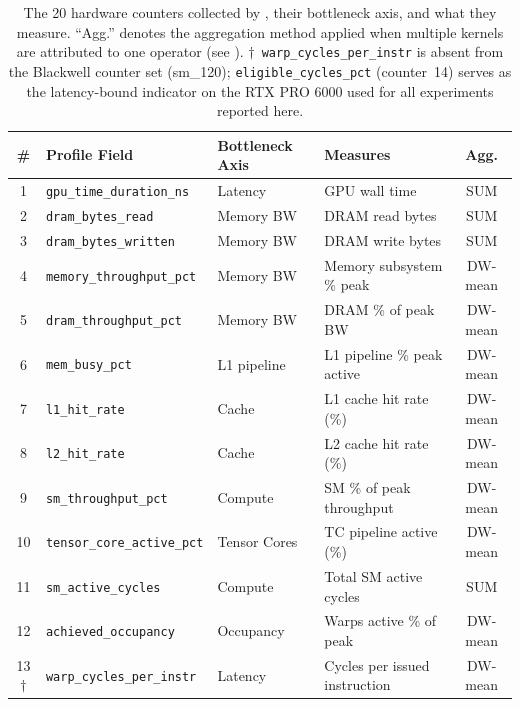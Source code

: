 \begin{table}[h]
\centering
\caption{The 20 hardware counters collected by \sys, their bottleneck axis, and
what they measure.  ``Agg.'' denotes the aggregation method
  applied when multiple kernels are attributed to one operator (see ).
  $\dagger$~\texttt{warp\_cycles\_per\_instr} is absent from the Blackwell counter set (sm\_120);
  \texttt{eligible\_\allowbreak cycles\_pct} (counter~14) serves as the latency-bound indicator on the
  RTX PRO 6000 used for all experiments reported here.}
\label{tab:counters}
\scriptsize
\setlength{\tabcolsep}{4pt}
\begin{tabular}{clllc}
\toprule
\textbf{\#} & \textbf{Profile Field} & \textbf{Bottleneck Axis} & \textbf{Measures} & \textbf{Agg.}\\
\midrule
1  & \texttt{gpu\_time\_duration\_ns}      & Latency          & GPU wall time                & SUM \\
2  & \texttt{dram\_bytes\_read}            & Memory BW        & DRAM read bytes              & SUM \\
3  & \texttt{dram\_bytes\_written}         & Memory BW        & DRAM write bytes             & SUM \\
4  & \texttt{memory\_throughput\_pct}      & Memory BW        & Memory subsystem \% peak     & DW-mean \\
5  & \texttt{dram\_throughput\_pct}        & Memory BW        & DRAM \% of peak BW           & DW-mean \\
6  & \texttt{mem\_busy\_pct}              & L1 pipeline      & L1 pipeline \% peak active   & DW-mean \\
7  & \texttt{l1\_hit\_rate}               & Cache            & L1 cache hit rate (\%)       & DW-mean \\
8  & \texttt{l2\_hit\_rate}               & Cache            & L2 cache hit rate (\%)       & DW-mean \\
9  & \texttt{sm\_throughput\_pct}         & Compute          & SM \% of peak throughput     & DW-mean \\
10 & \texttt{tensor\_core\_active\_pct}   & Tensor Cores     & TC pipeline active (\%)      & DW-mean \\
11 & \texttt{sm\_active\_cycles}          & Compute          & Total SM active cycles       & SUM \\
12 & \texttt{achieved\_occupancy}         & Occupancy        & Warps active \% of peak      & DW-mean \\
13$\dagger$ & \texttt{warp\_cycles\_per\_instr}    & Latency          & Cycles per issued instruction & DW-mean \\

\end{tabular}
\end{table}
